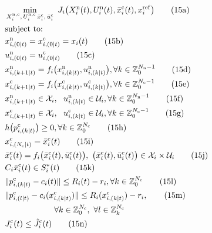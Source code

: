 \documentclass[twocolumn]{autart}
\begin{document}
\label{prob:local_fhocp}\addtocounter{equation}{-1}
\begin{align}
& \min_{X_i^{\mathrm{n,c}},\,U_i^{\mathrm{n,c}}\,\bar{x}_i^{\mathrm{c}},\,\bar{u}_i^{\mathrm{c}}}\
  J_i\big(X_i^{\mathrm{n}}(t), U_i^{\mathrm{n}}(t), \bar{x}^{\mathrm{c}}_i(t), x_i^{\mathrm{ref}}\big) \tag{15a}
  \label{prob:local_fhocp_obj}
\\
& \text{subject to:} \notag
\\
& x^{\mathrm{n}}_{i,(0|t)} = x^{\mathrm{c}}_{i,(0|t)} = x_i(t) \tag{15b}
  \label{prob:local_fhocp_init}
\\
& u^{\mathrm{n}}_{i,(0|t)} = u^{\mathrm{c}}_{i,(0|t)} \tag{15c}
  \label{prob:local_fhocp_shared}
\\
& x^{\mathrm{n}}_{i,(k+1|t)} = f_i \big(x^{\mathrm{n}}_{i,(k|t)}, u^{\mathrm{n}}_{i,(k|t)}\big),
  \forall k\in\mathbb{Z}_0^{N_{\mathrm{n}}-1} \tag{15d}
  \label{prob:local_fhocp_dyn_n}
\\
& x^{\mathrm{c}}_{i,(k+1|t)} = f_i \big(x^{\mathrm{c}}_{i,(k|t)}, u^{\mathrm{c}}_{i,(k|t)}\big),
  \forall k\in\mathbb{Z}_0^{N_{\mathrm{c}}-1} \tag{15e}
  \label{prob:local_fhocp_dyn_c}
\\
& x^{\mathrm{n}}_{i,(k+1|t)}\in\mathcal{X}_i,\ \ u^{\mathrm{n}}_{i,(k|t)}\in\mathcal{U}_i,
  \forall k\in\mathbb{Z}_0^{N_{\mathrm{n}}-1} \tag{15f}
  \label{prob:local_fhocp_bounds_n}
\\
& x^{\mathrm{c}}_{i,(k+1|t)}\in\mathcal{X}_i,\ \ u^{\mathrm{c}}_{i,(k|t)}\in\mathcal{U}_i,
  \forall k\in\mathbb{Z}_0^{N_{\mathrm{c}}-1} \tag{15g}
  \label{prob:local_fhocp_bounds_c}
\\
& h \bigl(p^{\mathrm{c}}_{i,(k|t)}\bigr) \ge 0,
  \forall k\in\mathbb{Z}_0^{N_{\mathrm{c}}} \tag{15h}
  \label{prob:static_obstacle_constraintsMPC}
\\
& x^{\mathrm{c}}_{i,(N_{\mathrm{c}}|t)} = \bar{x}^{\mathrm{c}}_i(t) \tag{15i}
  \label{prob:local_fhocp_terminal_state}
\\
& \bar{x}^{\mathrm{c}}_i(t)
= f_i \bigl(\bar{x}^{\mathrm{c}}_i(t),\bar{u}^{\mathrm{c}}_i(t)\bigr),
\ \bigl(\bar{x}^{\mathrm{c}}_i(t), 
\bar{u}^{\mathrm{c}}_i(t)\bigr)\in \mathcal{X}_i \times \mathcal{U}_i
\tag{15j}
\label{prob:local_fhocp_terminal_equilibrium}
\\
& C_i\bar{x}^{\mathrm{c}}_i(t)\in S_i^\ast(t) \tag{15k}
  \label{prob:local_fhocp_terminal_position}
\\
& \|p^{\mathrm{c}}_{i,(k|t)} - c_i(t)\| \le R_i(t) - r_i,
  \forall k\in\mathbb{Z}_0^{N_{\mathrm{c}}} \tag{15l}
  \label{prob:local_fhocp_containment}
\\
& \|p^{\mathrm{c}}_{i,(l|t)} - c_i(x^{\mathrm{c}}_{i,(k|t)})\| \leq R_i(x^{\mathrm{c}}_{i,(k|t)}) - r_i, \tag{15m}
  \label{prob:local_fhocp_tail}
\\
& \qquad \qquad \qquad \forall k\in\mathbb{Z}_0^{N_{\mathrm{c}}},\ \forall l\in\mathbb{Z}_k^{N_{\mathrm{c}}} \notag
\\
& J_i^{\mathrm{c}}(t) \le \hat{J}_i^{\mathrm{c}}(t) \tag{15n}
  \label{prob:local_fhocp_lyap}
\end{align}
\end{document}
